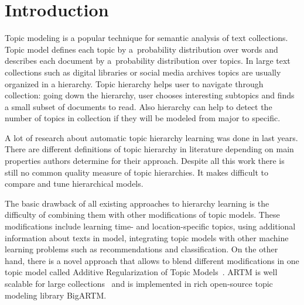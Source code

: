 \documentclass[12pt, twoside]{article}
\begin{document}

\maketitle
\linenumbers

\newcommand{\norm}{\mathop{\text{norm}}}

\section{Introduction}
\noindent %
Topic modeling is a popular technique for semantic analysis of text collections. Topic model defines each topic by a~probability distribution over words and describes each document by a~probability distribution over topics. 
In large text collections such as digital libraries or social media archives topics are usually organized in a hierarchy. Topic hierarchy helps user to navigate through collection: going down the hierarchy, user chooses interesting subtopics and finds a small subset of documents to read. Also hierarchy can help to detect the number of topics in collection if they will be modeled from major to specific.

A lot of research about automatic topic hierarchy learning was done in last years. There are different definitions of topic hierarchy in literature depending on main properties authors determine for their approach. Despite all this work there is still no common quality measure of topic hierarchies. It makes difficult to compare and tune hierarchical models.  

The basic drawback of all existing approaches to hierarchy learning is the difficulty of combining them with other modifications of topic models. These modifications include learning time- and location-specific topics, using additional information about texts in model, integrating topic models with other machine learning problems such as recommendations and classification. On the other hand, there is a novel approach that allows to blend different modifications in one topic model called Additive Regularization of Topic Models~\cite{ARTM}. 
ARTM is well scalable for large collections~\cite{BigARTM} and is implemented in rich open-source topic modeling library BigARTM.
\end{document}
